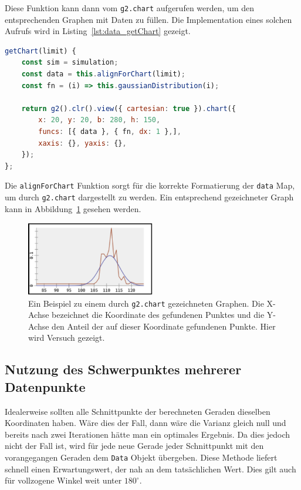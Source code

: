 Diese Funktion kann dann vom \lstinline{g2.chart} aufgerufen werden, um den entsprechenden Graphen mit Daten zu füllen.
Die Implementation eines solchen Aufrufs wird in Listing~\ref{lst:data_getChart} gezeigt.

\begin{lstlisting}[language=JavaScript, caption={Definition der \lstinline{getChart} Funktion der \lstinline{Data} Klasse.}, label={lst:data_getChart}]
getChart(limit) {
    const sim = simulation;
    const data = this.alignForChart(limit);
    const fn = (i) => this.gaussianDistribution(i);

    return g2().clr().view({ cartesian: true }).chart({
        x: 20, y: 20, b: 280, h: 150,
        funcs: [{ data }, { fn, dx: 1 },],
        xaxis: {}, yaxis: {},
    });
};
\end{lstlisting}

Die \lstinline{alignForChart} Funktion sorgt für die korrekte Formatierung der \lstinline{data} Map, um durch \lstinline{g2.chart} dargestellt zu werden.
Ein entsprechend gezeichneter Graph kann in Abbildung~\ref{fig:normalverteilung} gesehen werden.

\begin{figure}
    \centering
    \includegraphics[width=0.5\textwidth]{gfx/normalverteilung.png}
    \caption[Beispiel für in etwa normal verteilte Daten.]{Ein Beispiel zu einem durch \lstinline{g2.chart} gezeichneten Graphen. Die X-Achse bezeichnet die Koordinate des gefundenen Punktes und die Y-Achse den Anteil der auf dieser Koordinate gefundenen Punkte. Hier wird Versuch  gezeigt.}
    \label{fig:normalverteilung}
\end{figure}

\subsection{Nutzung des Schwerpunktes mehrerer Datenpunkte}\label{ch:nutzung_des_schwerpunktes}

Idealerweise sollten alle Schnittpunkte der berechneten Geraden dieselben Koordinaten haben.
Wäre dies der Fall, dann wäre die Varianz gleich null und bereits nach zwei Iterationen hätte man ein optimales Ergebnis.
Da dies jedoch nicht der Fall ist, wird für jede neue Gerade jeder Schnittpunkt mit den vorangegangen Geraden dem \lstinline{Data} Objekt übergeben.
Diese Methode liefert schnell einen Erwartungswert, der nah an dem tatsächlichen Wert.
Dies gilt auch für vollzogene Winkel weit unter $180^\circ$.

